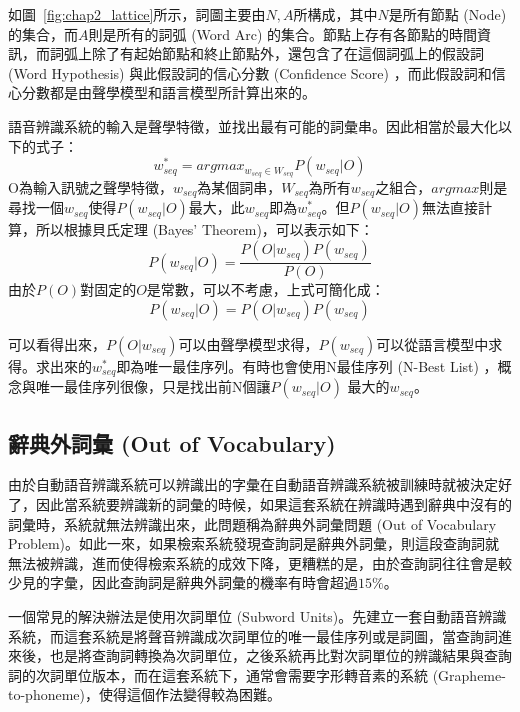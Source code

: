 如圖~\ref{fig:chap2_lattice}所示，詞圖主要由${N, A}$所構成，其中$N$是所有節點 (Node) 的集合，而$A$則是所有的詞弧 (Word Arc) 的集合。節點上存有各節點的時間資訊，而詞弧上除了有起始節點和終止節點外，還包含了在這個詞弧上的假設詞 (Word Hypothesis) 與此假設詞的信心分數 (Confidence Score) ，而此假設詞和信心分數都是由聲學模型和語言模型所計算出來的。

語音辨識系統的輸入是聲學特徵，並找出最有可能的詞彙串。因此相當於最大化以下的式子：
    \begin{equation}
    w^*_{seq} = argmax_{w_{seq} \in W_{seq}}P(w_{seq}|O)
    \end{equation}
O為輸入訊號之聲學特徵，$w_{seq}$為某個詞串，$W_{seq}$為所有$w_{seq}$之組合，$argmax$則是尋找一個$w_{seq}$使得$P(w_{seq}|O)$最大，此$w_{seq}$即為$w^*_{seq}$。但$P(w_{seq}|O)$無法直接計算，所以根據貝氏定理 (Bayes' Theorem)，可以表示如下：
    \begin{equation}
    P(w_{seq}|O) = \frac{P(O|w_{seq})P(w_{seq})}{P(O)}
    \end{equation}
由於$P(O)$對固定的$O$是常數，可以不考慮，上式可簡化成：
    \begin{equation}
    P(w_{seq}|O) = P(O|w_{seq})P(w_{seq})
    \end{equation}

可以看得出來，$P(O|w_{seq})$可以由聲學模型求得，$P(w_{seq})$可以從語言模型中求得。求出來的$w^*_{seq}$即為唯一最佳序列。有時也會使用N最佳序列 (N-Best List) ，概念與唯一最佳序列很像，只是找出前N個讓$P(w_{seq}|O)$ 最大的$w_{seq}$。

\subsection{辭典外詞彙 (Out of Vocabulary)}
由於自動語音辨識系統可以辨識出的字彙在自動語音辨識系統被訓練時就被決定好了，因此當系統要辨識新的詞彙的時候，如果這套系統在辨識時遇到辭典中沒有的詞彙時，系統就無法辨識出來，此問題稱為辭典外詞彙問題 (Out of Vocabulary Problem)。如此一來，如果檢索系統發現查詢詞是辭典外詞彙，則這段查詢詞就無法被辨識，進而使得檢索系統的成效下降，更糟糕的是，由於查詢詞往往會是較少見的字彙，因此查詢詞是辭典外詞彙的機率有時會超過$15\%$。

一個常見的解決辦法是使用次詞單位 (Subword Units)。先建立一套自動語音辨識系統，而這套系統是將聲音辨識成次詞單位的唯一最佳序列或是詞圖，當查詢詞進來後，也是將查詢詞轉換為次詞單位，之後系統再比對次詞單位的辨識結果與查詢詞的次詞單位版本，而在這套系統下，通常會需要字形轉音素的系統 (Grapheme-to-phoneme)，使得這個作法變得較為困難。

